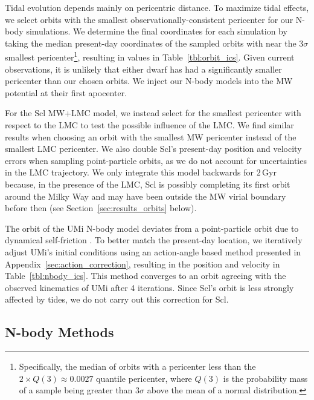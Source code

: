 \documentclass[times,trackchanges, twocolumn, twocolappendix]{aastex701}
\newcommand{\Gyr}{\text{Gyr}}
\begin{document}
Tidal evolution depends mainly on pericentric distance. To maximize tidal effects, we select orbits with the smallest observationally-consistent pericenter for our N-body simulations.
We determine the final coordinates for each simulation by taking the median present-day coordinates of the sampled orbits with near the $3\sigma$ smallest pericenter\footnote{
    Specifically, the median of orbits with a pericenter less than the $2\times Q(3)\approx 0.0027$ quantile pericenter, where $Q(3)$ is the probability mass of a sample being greater than $3\sigma$ above the mean of a normal distribution.
}, resulting in values in Table~\ref{tbl:orbit_ics}. 
Given current observations, it is unlikely that either dwarf has had a significantly smaller pericenter than our chosen orbits.
We inject our N-body models into the MW potential at their first apocenter. 


For the Scl MW+LMC model, we instead select for the smallest pericenter with respect to the LMC to test the possible influence of the LMC. We find similar results when choosing an orbit with the smallest MW pericenter instead of the smallest LMC pericenter. We also double Scl's present-day position and velocity errors when sampling point-particle orbits, as we do not account for uncertainties in the LMC trajectory. We only integrate this model backwards for $2\,\Gyr$ because, in the presence of the LMC, Scl is possibly completing its first orbit around the Milky Way and may have been outside the MW virial boundary before then (see Section~\ref{sec:results_orbits} below). 

The orbit of the UMi N-body model deviates from a point-particle orbit due to dynamical self-friction \citep[e.g.,][]{white1983, miller+2020}. To better match the present-day location, we iteratively adjust UMi's initial conditions using an action-angle based method presented in Appendix~\ref{sec:action_correction}, resulting in the position and velocity in Table~\ref{tbl:nbody_ics}. This method converges to an orbit agreeing
with the observed kinematics of UMi after 4 iterations.
Since Scl's orbit is less
strongly affected by tides, we do not carry out this correction for Scl.





\subsection{N-body Methods}\label{sec:nbody_methods}
\end{document}
